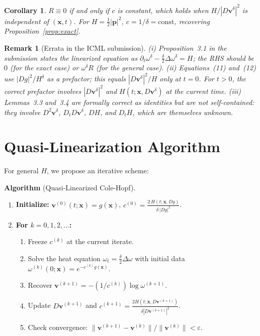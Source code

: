 \documentclass[11pt]{article}
\newtheorem{corollary}{Corollary}
\newtheorem{remark}{Remark}
\newcommand{\bx}{\bm{x}}
\newcommand{\bv}{\bm{v}}
\newcommand{\bp}{\bm{p}}
\begin{document}
\begin{corollary}
  $R \equiv 0$ if and only if $c$ is constant, which holds when
  $H/|D\bv^\delta|^2$ is independent of $(\bx,t)$.  For $H=\frac{1}{2}|\bp|^2$,
  $c = 1/\delta = \mathrm{const}$, recovering Proposition~\ref{prop:exact}.
\end{corollary}

\begin{remark}[Errata in the ICML submission]
  (i) Proposition~3.1 in the submission states the linearized equation as
  $\partial_t\omega^\delta - \frac{\delta}{2}\Delta\omega^\delta = H$;
  the RHS should be $0$ (for the exact case) or $\omega^\delta R$
  (for the general case).
  (ii) Equations~(11) and~(12) use $|Dg|^2/H^\delta$ as a prefactor;
  this equals $|D\bv^\delta|^2/H$ only at $t=0$.  For $t>0$, the
  correct prefactor involves $|D\bv^\delta|^2$ and $H(t;\bx,D\bv^\delta)$
  at the current time.
  (iii) Lemmas~3.3 and~3.4 are formally correct as identities but are
  not self-contained: they involve $D^2\bv^\delta$, $D_t D\bv^\delta$,
  $DH$, and $D_t H$, which are themselves unknown.
\end{remark}

\section{Quasi-Linearization Algorithm}

For general $H$, we propose an iterative scheme:

\medskip
\noindent\textbf{Algorithm} (Quasi-Linearized Cole-Hopf).

\begin{enumerate}
  \item \textbf{Initialize:} $\bv^{(0)}(t;\bx) = g(\bx)$, \;
        $c^{(0)} = \frac{2\,H(t;\bx,Dg)}{{\delta\,|Dg|^2}}$.
  \item \textbf{For $k = 0,1,2,\ldots$:}
    \begin{enumerate}
      \item Freeze $c^{(k)}$ at the current iterate.
      \item Solve the heat equation
            $\omega_t = \frac{\delta}{2}\Delta\omega$
            with initial data
            $\omega^{(k)}(0;\bx) = e^{-c^{(k)} g(\bx)}$.
      \item Recover $\bv^{(k+1)} = -(1/c^{(k)})\log\omega^{(k+1)}$.
      \item Update $D\bv^{(k+1)}$ and $c^{(k+1)} = \frac{2H(t;\bx,D\bv^{(k+1)})}{\delta|D\bv^{(k+1)}|^2}$.
      \item Check convergence: $\|\bv^{(k+1)} - \bv^{(k)}\|/\|\bv^{(k)}\| < \varepsilon$.
    \end{enumerate}
\end{enumerate}
\end{document}

